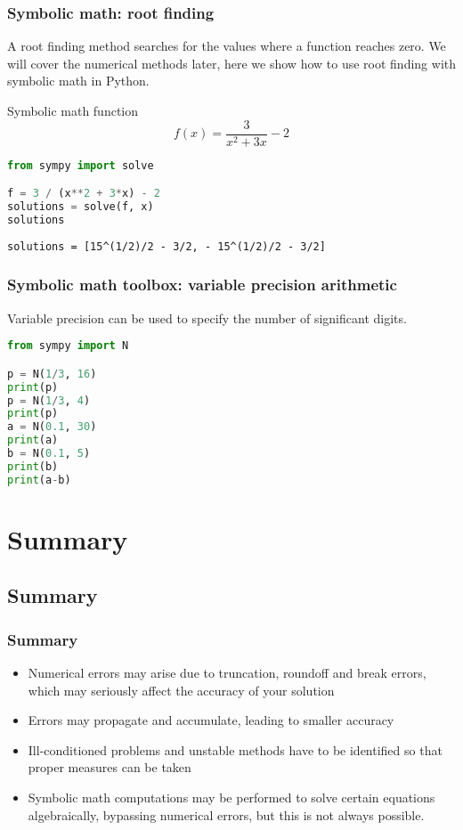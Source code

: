 \begin{frame}[fragile]
  \frametitle{Symbolic math: root finding }
  A root finding method searches for the values where a function reaches zero. We will cover the numerical methods later, here we show how to use root finding with symbolic math in Python.
   \begin{block}{Symbolic math function}
  \[ f(x) =   \frac{3}{x^2 + 3x} - 2 \]
  \pause
  \begin{lstlisting}[language=Python]
from sympy import solve

f = 3 / (x**2 + 3*x) - 2
solutions = solve(f, x)
solutions
  \end{lstlisting}
  \end{block}
  \pause
  \texttt{solutions = [15\textasciicircum(1/2)/2 - 3/2, - 15\textasciicircum(1/2)/2 - 3/2]}
\end{frame}

\begin{frame}[fragile]
  \frametitle{Symbolic math toolbox: variable precision arithmetic}
  Variable precision can be used to specify the number of significant digits.
      \begin{lstlisting}[language=Python]
from sympy import N

p = N(1/3, 16)
print(p)
p = N(1/3, 4)
print(p)
a = N(0.1, 30)
print(a)
b = N(0.1, 5)
print(b)
print(a-b)
  \end{lstlisting}
  \end{frame}


 
\section{Summary}
\subsection*{Summary}
\begin{frame}
  \frametitle{Summary}
  \begin{itemize}
     \item Numerical errors may arise due to truncation, roundoff and break errors, which may seriously affect the accuracy of your solution
     \item Errors may propagate and accumulate, leading to smaller accuracy
     \item Ill-conditioned problems and unstable methods have to be identified so that proper measures can be taken
     \item Symbolic math computations may be performed to solve certain equations algebraically, bypassing numerical errors, but this is not always possible.
  \end{itemize}

\end{frame}


